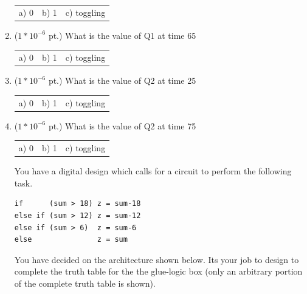 \documentclass{article}
\begin{document}
\begin{enumerate}
\begin{tabular}{p{0.75in}p{0.75in}p{1.75in}}
a) 0 & b) 1 & c) toggling \\
\end{tabular}

\item {($1*10^{-6}$ pt.)} What is the value of Q1 at time 65

\begin{tabular}{p{0.75in}p{0.75in}p{1.75in}}
a) 0 & b) 1 & c) toggling \\
\end{tabular}

\item {($1*10^{-6}$ pt.)} What is the value of Q2 at time 25

\begin{tabular}{p{0.75in}p{0.75in}p{1.75in}}
a) 0 & b) 1 & c) toggling \\
\end{tabular}

\item {($1*10^{-6}$ pt.)} What is the value of Q2 at time 75

\begin{tabular}{p{0.75in}p{0.75in}p{1.75in}}
a) 0 & b) 1 & c) toggling \\
\end{tabular}

\pagebreak
You have a digital design which calls for a circuit to perform the 
following task.

\begin{verbatim}
if      (sum > 18) z = sum-18
else if (sum > 12) z = sum-12
else if (sum > 6)  z = sum-6
else               z = sum
\end{verbatim}

You have decided on the architecture shown below.  
Its your job to design to complete the truth table
for the the glue-logic box (only an arbitrary portion of the complete 
truth table is shown).  



\end{enumerate}
\end{document}
